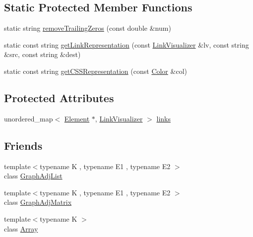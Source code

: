\subsection*{Static Protected Member Functions}
\begin{DoxyCompactItemize}
\item 
static string \mbox{\hyperlink{classbridges_1_1_element_a0b905a076a71771a20ee4fb0ec858cfa}{remove\+Trailing\+Zeros}} (const double \&num)
\item 
static const string \mbox{\hyperlink{classbridges_1_1_element_ac6fa7b04e28a1e9b8d8f2d395dd6e2c1}{get\+Link\+Representation}} (const \mbox{\hyperlink{classbridges_1_1_link_visualizer}{Link\+Visualizer}} \&lv, const string \&src, const string \&dest)
\item 
static const string \mbox{\hyperlink{classbridges_1_1_element_a513b3409e4b689a390b0dcd50cc2d643}{get\+C\+S\+S\+Representation}} (const \mbox{\hyperlink{classbridges_1_1_color}{Color}} \&col)
\end{DoxyCompactItemize}
\subsection*{Protected Attributes}
\begin{DoxyCompactItemize}
\item 
unordered\+\_\+map$<$ \mbox{\hyperlink{classbridges_1_1_element}{Element}} $\ast$, \mbox{\hyperlink{classbridges_1_1_link_visualizer}{Link\+Visualizer}} $>$ \mbox{\hyperlink{classbridges_1_1_element_a6fb53728edc378f26238543b26238496}{links}}
\end{DoxyCompactItemize}
\subsection*{Friends}
\begin{DoxyCompactItemize}
\item 
{\footnotesize template$<$typename K , typename E1 , typename E2 $>$ }\\class \mbox{\hyperlink{classbridges_1_1_element_a65850138f0763fec43a76fb942f0eccc}{Graph\+Adj\+List}}
\item 
{\footnotesize template$<$typename K , typename E1 , typename E2 $>$ }\\class \mbox{\hyperlink{classbridges_1_1_element_a1935808473b7eb8ff54149c5436c3ac9}{Graph\+Adj\+Matrix}}
\item 
{\footnotesize template$<$typename K $>$ }\\class \mbox{\hyperlink{classbridges_1_1_element_ab1a595168ea1870ce436dfd2d8e69b6d}{Array}}
\end{DoxyCompactItemize}


